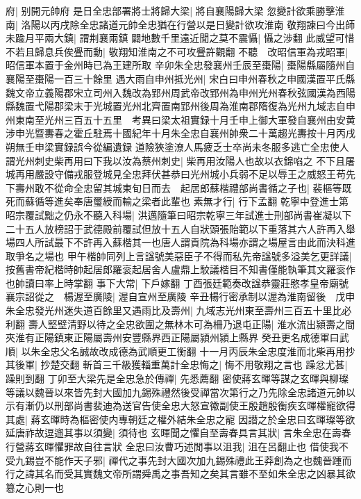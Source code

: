 府|{
	别開元帥府}
是日全忠部署將士將歸大梁|{
	將自襄陽歸大梁}
忽變計欲乘勝擊淮南|{
	洛陽以丙戌除全忠諸道元帥全忠猶在行營以是日變計欲攻淮南}
敬翔諫曰今出師未踰月平兩大鎮|{
	謂荆襄兩鎮}
闢地數千里遠近聞之莫不震懾|{
	懾之涉翻}
此威望可惜不若且歸息兵俟舋而動|{
	敬翔知淮南之不可攻舋許觀翻}
不聽　改昭信軍為戎昭軍|{
	昭信軍本置于金州時已為王建所取}
辛卯朱全忠發襄州壬辰至棗陽|{
	棗陽縣屬隨州自襄陽至棗陽一百三十餘里}
遇大雨自申州抵光州|{
	宋白曰申州春秋之申國漢置平氏縣魏文帝立義陽郡宋立司州入魏改為郢州周武帝改郢州為申州光州春秋弦國漢為西陽縣魏置弋陽郡梁末于光城置光州北齊置南郢州後周為淮南郡隋復為光州九域志自申州東南至光州三百五十五里　考異曰梁太祖實録十月壬申上御大軍發自襄州由安黄涉申光暨夀春之霍丘駐焉十國紀年十月朱全忠自襄州帥衆二十萬趨光夀按十月丙戌朔無壬申梁實録誤今從編遺録}
道險狹塗潦人馬疲乏士卒尚未冬服多逃亡全忠使人謂光州刺史柴再用曰下我以汝為蔡州刺史|{
	柴再用汝陽人也故以衣錦啗之}
不下且屠城再用嚴設守備戎服登城見全忠拜伏甚恭曰光州城小兵弱不足以辱王之威怒王苟先下壽州敢不從命全忠留其城東旬日而去　起居郎蘇楷禮部尚書循之子也|{
	裴樞等既死而蘇循等進矣奉唐璽綬而輸之梁者此輩也}
素無才行|{
	行下孟翻}
乾寧中登進士第昭宗覆試黜之仍永不聽入科場|{
	洪邁隨筆曰昭宗乾寧三年試進士刑部尚書崔凝以下二十五人放榜詔于武德殿前覆試但放十五人自狀頭張貽範以下重落其六人許再入舉場四人所試最下不許再入蘇楷其一也唐人謂貢院為科場亦謂之場屋言由此而決科進取爭名之場也}
甲午楷帥同列上言諡號美惡臣子不得而私先帝諡號多溢美乞更詳議|{
	按舊書帝紀楷時帥起居郎羅衮起居舍人盧鼎上駮議楷目不知書僅能執筆其文羅衮作也帥讀曰率上時掌翻}
事下大常|{
	下戶嫁翻}
丁酉張廷範奏改諡恭靈莊愍孝皇帝廟號襄宗詔從之　楊渥至廣陵|{
	渥自宣州至廣陵}
辛丑楊行密承制以渥為淮南留後　戊申朱全忠發光州迷失道百餘里又遇雨比及壽州|{
	九域志光州東至壽州三百五十里比必利翻}
壽人堅壁清野以待之全忠欲圍之無林木可為柵乃退屯正陽|{
	淮水流出潁壽之間夾淮有正陽鎮東正陽屬壽州安豐縣界西正陽屬潁州潁上縣界}
癸丑更名成德軍曰武順|{
	以朱全忠父名誠故改成德為武順更工衡翻}
十一月丙辰朱全忠度淮而北柴再用抄其後軍|{
	抄楚交翻}
斬首三千級獲輜重萬計全忠悔之|{
	悔不用敬翔之言也}
躁忿尤甚|{
	躁則到翻}
丁卯至大梁先是全忠急於傳禪|{
	先悉薦翻}
密使蔣玄暉等謀之玄暉與柳璨等議以魏晉以來皆先封大國加九錫殊禮然後受禪當次第行之乃先除全忠諸道元帥以示有漸仍以刑部尚書裴迪為送官告使全忠大怒宣徽副使王殷趙殷衡疾玄暉權寵欲得其處|{
	蔣玄暉時為樞密使内專朝廷之權外結朱全忠之寵}
因譛之於全忠曰玄暉璨等欲延唐祚故逗遛其事以須變|{
	須待也}
玄暉聞之懼自至壽春具言其狀|{
	言朱全忠在壽春行營蔣玄暉懼罪故自往言狀}
全忠曰汝曹巧述閒事以沮我|{
	沮在呂翻止也}
借使我不受九錫豈不能作天子邪|{
	禪代之事先封大國次加九錫殊禮此王莽創為之也魏晉踵而行之諱其名而受其實魏文帝所謂舜禹之事吾知之矣其言雖不至如朱全忠之凶暴其欲簒之心則一也}
